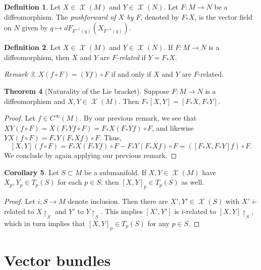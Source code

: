 \documentclass[10pt,letterpaper,cm]{nupset}
\theoremstyle{definition}
\newtheorem{definition}{Definition}[subsection]
\theoremstyle{theorem}
\newtheorem{theorem}[definition]{Theorem}
\newtheorem{corollary}[definition]{Corollary}
\theoremstyle{remark}
\newtheorem{remark}[definition]{Remark}
\newcommand{\1}{\mathbf{1}}
\newcommand{\0}{\vec 0}
\DeclareMathOperator{\vf}{\mathscr{X}}
\begin{document}
\begin{definition}
Let $X \in \vf(M)$ and $Y \in \vf(N)$. Let $F: M \to N$ be a diffeomorphism. The \textit{pushforward of $X$ by $F$}, denoted by $F_{\ast}X$, is the vector field on $N$ given by $q \mapsto dF_{F^{-1}(q)}(X_{F^{-1}(q)})$.
\end{definition}

\begin{definition}
Let $X \in \vf(M)$ and $Y \in \vf(N)$. If $F: M \to N$ is a diffeomorphism, then $X$ and $Y$ are \textit{$F$-related} if $Y = F_{\ast}X$.
\end{definition}

\begin{remark}
$X(f \circ F) = (Yf) \circ F$ if and only if $X$ and $Y$ are $F$-related.
\end{remark}

\begin{theorem}[Naturality of the Lie bracket]
Suppose $F: M \to N$ is a diffeomorphism and $X, Y \in \vf(M)$. Then $F_{\ast}[X, Y] = [F_{\ast}X, F_{\ast}Y]$.
\end{theorem}
\begin{proof}
Let $ f\in C^{\infty}(M)$. By our previous remark, we see that $XY(f \circ F) = X(F_{\ast}Yf \circ F) = F_{\ast}X(F_{\ast}Yf) \circ F$, and likewise $YX(f \circ F) = F_{\ast}Y(F_{\ast}X f) \circ F$. Thus, $$[X, Y](f \circ F) = F_{\ast}X(F_{\ast}Yf) \circ F - F_{\ast}Y(F_{\ast}X f) \circ F = ([F_{\ast}X, F_{\ast}Y] f) \circ F.$$ We conclude by again applying our previous remark.
\end{proof}

\begin{corollary}
Let $S \subset M$ be a submanifold. If $X, Y \in \vf(M)$ have $X_p, Y_p \in T_p(S)$ for each $p\in S$, then $[X, Y]_p \in T_p(S)$ as well.
\end{corollary}
\begin{proof}
Let $i : S \to M$ denote inclusion. Then  there are $X', Y' \in \vf(S)$ with $X'$ $i$-related to $X\restriction_S$ and $Y'$ to $Y\restriction_S$. This implies $[X', Y']$ is $i$-related to $[X, Y]\restriction_S$, which in turn implies that $[X, Y]_p \in T_p(S)$ for any $p\in S$.  
\end{proof}

\section{Vector bundles}
\end{document}
